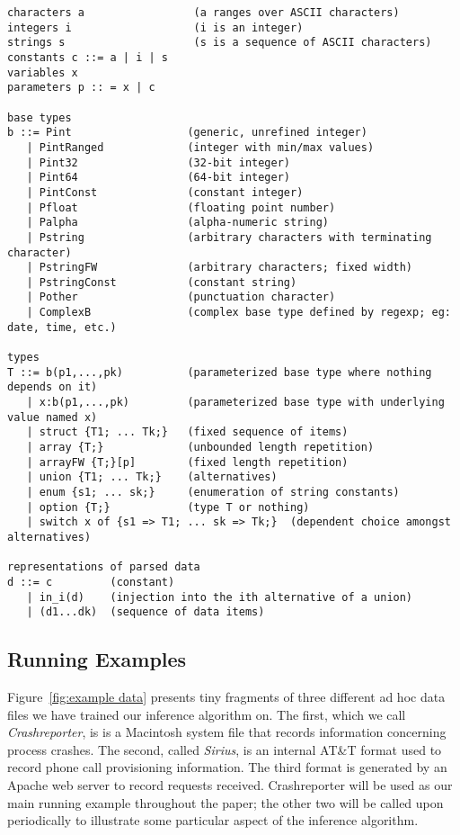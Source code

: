 \begin {figure*}
\begin {verbatim}
characters a                 (a ranges over ASCII characters)
integers i                   (i is an integer)
strings s                    (s is a sequence of ASCII characters)
constants c ::= a | i | s
variables x
parameters p :: = x | c

base types
b ::= Pint                  (generic, unrefined integer)
   | PintRanged             (integer with min/max values)
   | Pint32                 (32-bit integer)
   | Pint64                 (64-bit integer)
   | PintConst              (constant integer)
   | Pfloat                 (floating point number)
   | Palpha                 (alpha-numeric string)
   | Pstring                (arbitrary characters with terminating character)
   | PstringFW              (arbitrary characters; fixed width)
   | PstringConst           (constant string)
   | Pother                 (punctuation character)
   | ComplexB               (complex base type defined by regexp; eg: date, time, etc.)

types
T ::= b(p1,...,pk)          (parameterized base type where nothing depends on it)
   | x:b(p1,...,pk)         (parameterized base type with underlying value named x)     
   | struct {T1; ... Tk;}   (fixed sequence of items)
   | array {T;}             (unbounded length repetition)
   | arrayFW {T;}[p]        (fixed length repetition) 
   | union {T1; ... Tk;}    (alternatives)
   | enum {s1; ... sk;}     (enumeration of string constants)
   | option {T;}            (type T or nothing)
   | switch x of {s1 => T1; ... sk => Tk;}  (dependent choice amongst alternatives)

representations of parsed data
d ::= c         (constant)
   | in_i(d)    (injection into the ith alternative of a union)
   | (d1...dk)  (sequence of data items)

\end{verbatim}
\caption {Selected elements of the \ir{}.  Note: formatting needed.}
\label{fig:ir}
\end{figure*}

\subsection{Running Examples}

Figure~\ref{fig:example data} presents tiny fragments of three different ad hoc data files
we have trained our inference algorithm on.  The first, which we call {\em Crashreporter}, is
is a Macintosh system file that records information concerning process crashes. The second, called {\em Sirius},
is an internal AT\&T format used to record phone call provisioning information. The third format
is generated by an Apache web server to record requests received.  Crashreporter
will be used as our main running example throughout the paper; the other two will be called upon
periodically to illustrate some particular aspect of the inference algorithm.

